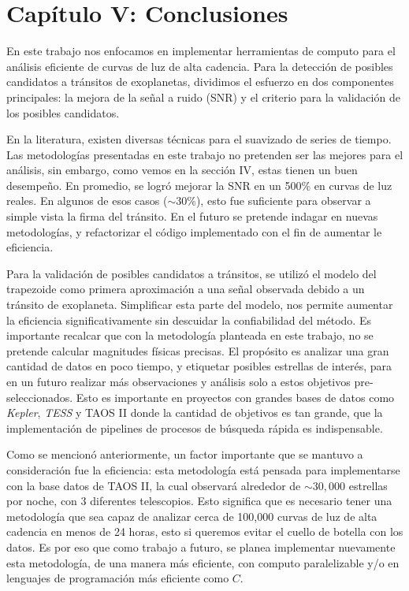 \chapter*{\textbf{Capítulo V: Conclusiones}}
\label{ch:Conclusiones}
\setcounter{chapter}{5}
\setcounter{equation}{0}
\setcounter{figure}{0}
\setcounter{table}{0}

En este trabajo nos enfocamos en implementar herramientas de computo para el análisis eficiente de curvas de luz de alta cadencia. Para la detección de posibles candidatos a tránsitos de exoplanetas, dividimos el esfuerzo en dos componentes principales: la mejora de la señal a ruido (SNR) y el criterio para la validación de los posibles candidatos.


En la literatura, existen diversas técnicas para el suavizado de series de tiempo. Las metodologías presentadas en este trabajo no pretenden ser las mejores para el análisis, sin embargo, como vemos en la sección IV, estas tienen un buen desempeño. En promedio, se logró mejorar la SNR en un 500\% en curvas de luz reales. En algunos de esos casos ($\sim 30$\%), esto fue suficiente para observar a simple vista la firma del tránsito. En el futuro se pretende indagar en nuevas metodologías, y refactorizar el código implementado con el fin de aumentar le eficiencia.

Para la validación de posibles candidatos a tránsitos, se utilizó el modelo del trapezoide como primera aproximación a una señal observada debido a un tránsito de exoplaneta. Simplificar esta parte del modelo, nos permite aumentar la eficiencia significativamente sin descuidar la confiabilidad del método. Es importante recalcar que con la metodología planteada en este trabajo, no se pretende calcular magnitudes físicas precisas. El propósito es analizar una gran cantidad de datos en poco tiempo, y etiquetar posibles estrellas de interés, para en un futuro realizar más observaciones y análisis solo a estos objetivos pre-seleccionados. Esto es importante en proyectos con grandes bases de datos como \textit{Kepler}, \textit{TESS} y TAOS II donde la cantidad de objetivos es tan grande, que la implementación de pipelines de procesos de búsqueda rápida es indispensable.


Como se mencionó anteriormente, un factor importante que se mantuvo a consideración fue la eficiencia: esta metodología está pensada para implementarse con la base datos de TAOS II, la cual observará alrededor de $\sim 30,000$ estrellas por noche, con 3 diferentes telescopios. Esto significa que es necesario tener una metodología que sea capaz de analizar cerca de 100,000 curvas de luz de alta cadencia en menos de 24 horas, esto si queremos evitar el cuello de botella con los datos. Es por eso que como trabajo a futuro, se planea implementar nuevamente esta metodología, de una manera más eficiente, con computo paralelizable y/o en lenguajes de programación más eficiente como $C$.


